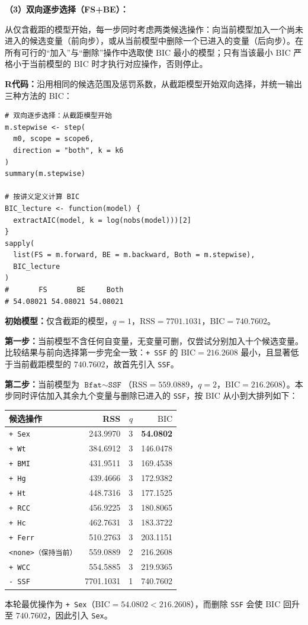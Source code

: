 \documentclass[12pt,a4paper]{article}
\begin{document}
\begin{answerbox}
\textbf{（3）双向逐步选择（FS+BE）：}

从仅含截距的模型开始，每一步同时考虑两类候选操作：向当前模型加入一个尚未进入的候选变量（前向步），或从当前模型中删除一个已进入的变量（后向步）。在所有可行的``加入''与``删除''操作中选取使 $\mathrm{BIC}$ 最小的模型；只有当该最小 $\mathrm{BIC}$ 严格小于当前模型的 $\mathrm{BIC}$ 时才执行对应操作，否则停止。

\textbf{R代码：}沿用相同的候选范围及惩罚系数，从截距模型开始双向选择，并统一输出三种方法的 BIC：
\begin{lstlisting}[style=rcode]
# 双向逐步选择：从截距模型开始
m.stepwise <- step(
  m0, scope = scope6,
  direction = "both", k = k6
)
summary(m.stepwise)

# 按讲义定义计算 BIC
BIC_lecture <- function(model) {
  extractAIC(model, k = log(nobs(model)))[2]
}
sapply(
  list(FS = m.forward, BE = m.backward, Both = m.stepwise),
  BIC_lecture
)
#       FS       BE     Both
# 54.08021 54.08021 54.08021
\end{lstlisting}

\textbf{初始模型：}仅含截距的模型，$q=1$，$\mathrm{RSS}=7701.1031$，$\mathrm{BIC}=740.7602$。

\textbf{第一步：}当前模型不含任何自变量，无变量可删，仅尝试分别加入十个候选变量。比较结果与前向选择第一步完全一致：\texttt{+ SSF} 的 $\mathrm{BIC}=216.2608$ 最小，且显著低于当前截距模型的 $740.7602$，故首先引入 \texttt{SSF}。

\textbf{第二步：}当前模型为 $\texttt{Bfat}\sim\texttt{SSF}$（$\mathrm{RSS}=559.0889$，$q=2$，$\mathrm{BIC}=216.2608$）。本步同时评估加入其余九个变量与删除已进入的 \texttt{SSF}，按 $\mathrm{BIC}$ 从小到大排列如下：
\begin{center}
\small
\begin{tabular}{lrrr}
\toprule
候选操作 & RSS & $q$ & $\mathrm{BIC}$ \\
\midrule
\texttt{+ Sex} & 243.9970 & 3 & \textbf{54.0802} \\
\texttt{+ Wt} & 384.6912 & 3 & 146.0478 \\
\texttt{+ BMI} & 431.9511 & 3 & 169.4538 \\
\texttt{+ Hg} & 439.4666 & 3 & 172.9382 \\
\texttt{+ Ht} & 448.7316 & 3 & 177.1525 \\
\texttt{+ RCC} & 456.9225 & 3 & 180.8065 \\
\texttt{+ Hc} & 462.7631 & 3 & 183.3722 \\
\texttt{+ Ferr} & 510.2763 & 3 & 203.1151 \\
\texttt{<none>（保持当前）} & 559.0889 & 2 & 216.2608 \\
\texttt{+ WCC} & 554.5885 & 3 & 219.9365 \\
\texttt{- SSF} & 7701.1031 & 1 & 740.7602 \\
\bottomrule
\end{tabular}
\end{center}
本轮最优操作为 \texttt{+ Sex}（$\mathrm{BIC}=54.0802<216.2608$），而删除 \texttt{SSF} 会使 $\mathrm{BIC}$ 回升至 $740.7602$，因此引入 \texttt{Sex}。


\end{answerbox}
\end{document}

